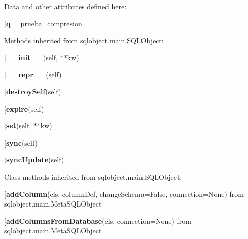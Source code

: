 Data and other attributes defined here:\\
\begin{description}\item[{\bf q} = prueba\_compresion\end{description}


Methods inherited from sqlobject.main.SQLObject:\\
\begin{description}\item[{\bf \_\_init\_\_}(self, **kw)\end{description}

\begin{description}\item[{\bf \_\_repr\_\_}(self)\end{description}

\begin{description}\item[{\bf destroySelf}(self)\end{description}

\begin{description}\item[{\bf expire}(self)\end{description}

\begin{description}\item[{\bf set}(self, **kw)\end{description}

\begin{description}\item[{\bf sync}(self)\end{description}

\begin{description}\item[{\bf syncUpdate}(self)\end{description}


Class methods inherited from sqlobject.main.SQLObject:\\
\begin{description}\item[{\bf addColumn}(cls, columnDef, changeSchema=False, connection=None) from sqlobject.main.MetaSQLObject\end{description}

\begin{description}\item[{\bf addColumnsFromDatabase}(cls, connection=None) from sqlobject.main.MetaSQLObject\end{description}

